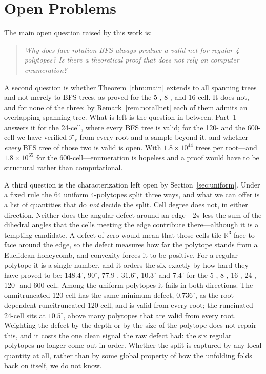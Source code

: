 \documentclass[11pt,letterpaper]{article}
\begin{document}
\section{Open Problems}\label{sec:open}

The main open question raised by this work is:

\begin{quote}
\textit{Why does face-rotation BFS always produce a valid net for
regular 4-polytopes?
Is there a theoretical proof that does not rely on computer
enumeration?}
\end{quote}

A second question is whether Theorem~\ref{thm:main} extends to all
spanning trees and not merely to BFS trees, as \cite{DevadossHarvey2022}
proved for the 5-, 8-, and 16-cell.
It does not, and for none of the three: by Remark~\ref{rem:notallnet}
each of them admits an overlapping spanning tree.
What is left is the question in between.
Part~1 answers it for the 24-cell, where every BFS tree is valid; for the
120- and the 600-cell we have verified $\mathcal{T}_r$ from every root and
a sample beyond it, and whether \emph{every} BFS tree of those two is
valid is open.
With $1.8\times10^{44}$ trees per root---and $1.8\times10^{65}$ for the
600-cell---enumeration is hopeless and a proof would have to be
structural rather than computational.

A third question is the characterization left open by
Section~\ref{sec:uniform}.
Under a fixed rule the 64 uniform 4-polytopes split three ways, and
what we can offer is a list of quantities that do \emph{not} decide the
split.
Cell degree does not, in either direction.
Neither does the angular defect around an edge---$2\pi$ less the sum of
the dihedral angles that the cells meeting the edge contribute
there---although it is a tempting candidate.
A defect of zero would mean that those cells tile $\mathbb{R}^3$
face-to-face around the edge, so the defect measures how far the
polytope stands from a Euclidean honeycomb, and convexity forces it to
be positive.
For a regular polytope it is a single number, and it orders the six
exactly by how hard they have proved to be: $148.4^\circ$, $90^\circ$,
$77.9^\circ$, $31.6^\circ$, $10.3^\circ$ and $7.4^\circ$ for the 5-,
8-, 16-, 24-, 120- and 600-cell.
Among the uniform polytopes it fails in both directions.
The omnitruncated 120-cell has the same minimum defect, $0.736^\circ$,
as the root-dependent runcitruncated 120-cell, and is valid from every
root; the runcinated 24-cell sits at $10.5^\circ$, above many polytopes
that are valid from every root.
Weighting the defect by the depth or by the size of the polytope does
not repair this, and it costs the one clean signal the raw defect had:
the six regular polytopes no longer come out in order.
Whether the split is captured by any local quantity at all, rather than
by some global property of how the unfolding folds back on itself, we
do not know.
\end{document}
